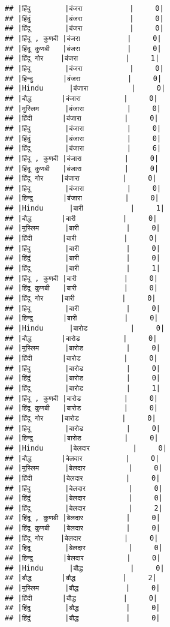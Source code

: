 \documentclass[
]{article}
\begin{document}
\begin{verbatim}
## |हिंदु        |बंजरा           |     0|
## |हिंदुं        |बंजरा           |     0|
## |हिंदू        |बंजरा           |     0|
## |हिंदू , कुणबी |बंजरा           |     0|
## |हिंदू कुणबी   |बंजरा           |     0|
## |हिंदू गोर    |बंजरा           |     1|
## |हिदू        |बंजरा           |     0|
## |हिन्दु       |बंजरा           |     0|
## |Hindu      |बंजारा          |     0|
## |बौद्ध       |बंजारा          |     0|
## |मुस्लिम      |बंजारा          |     0|
## |हिंदी       |बंजारा          |     0|
## |हिंदु        |बंजारा          |     0|
## |हिंदुं        |बंजारा          |     0|
## |हिंदू        |बंजारा          |     6|
## |हिंदू , कुणबी |बंजारा          |     0|
## |हिंदू कुणबी   |बंजारा          |     0|
## |हिंदू गोर    |बंजारा          |     0|
## |हिदू        |बंजारा          |     0|
## |हिन्दु       |बंजारा          |     0|
## |Hindu      |बारी           |     1|
## |बौद्ध       |बारी           |     0|
## |मुस्लिम      |बारी           |     0|
## |हिंदी       |बारी           |     0|
## |हिंदु        |बारी           |     0|
## |हिंदुं        |बारी           |     0|
## |हिंदू        |बारी           |     1|
## |हिंदू , कुणबी |बारी           |     0|
## |हिंदू कुणबी   |बारी           |     0|
## |हिंदू गोर    |बारी           |     0|
## |हिदू        |बारी           |     0|
## |हिन्दु       |बारी           |     0|
## |Hindu      |बारोड          |     0|
## |बौद्ध       |बारोड          |     0|
## |मुस्लिम      |बारोड          |     0|
## |हिंदी       |बारोड          |     0|
## |हिंदु        |बारोड          |     0|
## |हिंदुं        |बारोड          |     0|
## |हिंदू        |बारोड          |     1|
## |हिंदू , कुणबी |बारोड          |     0|
## |हिंदू कुणबी   |बारोड          |     0|
## |हिंदू गोर    |बारोड          |     0|
## |हिदू        |बारोड          |     0|
## |हिन्दु       |बारोड          |     0|
## |Hindu      |बेलदार          |     0|
## |बौद्ध       |बेलदार          |     0|
## |मुस्लिम      |बेलदार          |     0|
## |हिंदी       |बेलदार          |     0|
## |हिंदु        |बेलदार          |     0|
## |हिंदुं        |बेलदार          |     0|
## |हिंदू        |बेलदार          |     2|
## |हिंदू , कुणबी |बेलदार          |     0|
## |हिंदू कुणबी   |बेलदार          |     0|
## |हिंदू गोर    |बेलदार          |     0|
## |हिदू        |बेलदार          |     0|
## |हिन्दु       |बेलदार          |     0|
## |Hindu      |बौद्ध           |     0|
## |बौद्ध       |बौद्ध           |     2|
## |मुस्लिम      |बौद्ध           |     0|
## |हिंदी       |बौद्ध           |     0|
## |हिंदु        |बौद्ध           |     0|
## |हिंदुं        |बौद्ध           |     0|

\end{verbatim}
\end{document}

